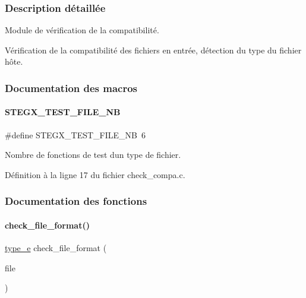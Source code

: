 \subsubsection{Description détaillée}
Module de vérification de la compatibilité. 

Vérification de la compatibilité des fichiers en entrée, détection du type du fichier hôte. 

\subsubsection{Documentation des macros}
\mbox{\label{a00044_a2193695d4dc432c1b482fbcbaaa855b8}} 
\paragraph{\texorpdfstring{S\+T\+E\+G\+X\+\_\+\+T\+E\+S\+T\+\_\+\+F\+I\+L\+E\+\_\+\+NB}{STEGX\_TEST\_FILE\_NB}}
{\footnotesize\ttfamily \#define S\+T\+E\+G\+X\+\_\+\+T\+E\+S\+T\+\_\+\+F\+I\+L\+E\+\_\+\+NB~6}

Nombre de fonctions de test d\textquotesingle{}un type de fichier. 

Définition à la ligne 17 du fichier check\+\_\+compa.\+c.



\subsubsection{Documentation des fonctions}
\mbox{\label{a00044_aa5fe126b37cde4faccaaf190a3b977d3}} 
\paragraph{\texorpdfstring{check\+\_\+file\+\_\+format()}{check\_file\_format()}}
{\footnotesize\ttfamily \hyperlink{a00047_af1ca434cca36ba9fb2a45f6cef3a16d6}{type\+\_\+e} check\+\_\+file\+\_\+format (\begin{DoxyParamCaption}\item[{F\+I\+LE $\ast$}]{file }\end{DoxyParamCaption})}



